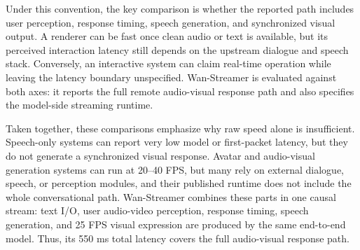 \documentclass{llmxive}
\providecommand{\model}{Wan-Streamer\xspace}
\begin{document}
Under this convention, the key comparison is whether the reported path includes user perception, response timing, speech generation, and synchronized visual output. A renderer can be fast once clean audio or text is available, but its perceived interaction latency still depends on the upstream dialogue and speech stack. Conversely, an interactive system can claim real-time operation while leaving the latency boundary unspecified. \model is evaluated against both axes: it reports the full remote audio-visual response path and also specifies the model-side streaming runtime.

Taken together, these comparisons emphasize why raw speed alone is insufficient. Speech-only systems can report very low model or first-packet latency, but they do not generate a synchronized visual response. Avatar and audio-visual generation systems can run at 20--40 FPS, but many rely on external dialogue, speech, or perception modules, and their published runtime does not include the whole conversational path. \model combines these parts in one causal stream: text I/O, user audio-video perception, response timing, speech generation, and 25 FPS visual expression are produced by the same end-to-end model. Thus, its 550 ms total latency covers the full audio-visual response path.
\end{document}
